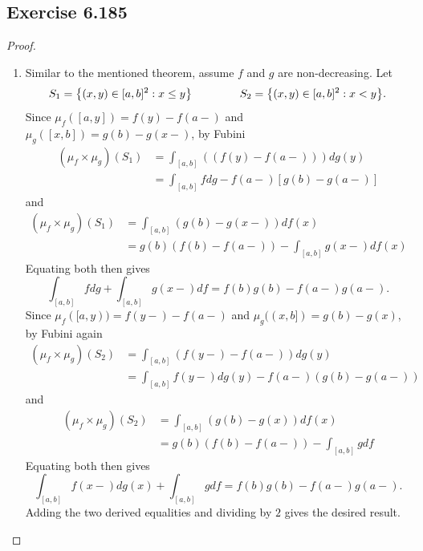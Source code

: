 \documentclass[hw_all.tex]{subfiles}
\begin{document}
\subsection{Exercise 6.185}
\begin{proof}
    \begin{enumerate}
        \item
            Similar to the mentioned theorem, assume $f$ and $g$ are non-decreasing. Let
            \[
                S_1 = \qty{(x,y) \in [a,b]^2 : x \leq y} \hspace{1.5cm} S_2 = \qty{(x,y) \in [a,b]^2 : x < y}
            .\]
            Since $\mu_f([a,y]) = f(y) - f(a-)$ and $\mu_g([x,b]) = g(b) - g(x-)$, by Fubini
            \begin{align*}
                (\mu_f \times \mu_g)(S_1) &= \int_{[a,b]} ((f(y) - f(a-))) dg(y) \\
                                          &= \int_{[a,b]} f dg - f(a-) [g(b) - g(a-)]
            \end{align*}
            and
            \begin{align*}
                (\mu_f \times \mu_g)(S_1) &= \int_{[a,b]} (g(b) - g(x-)) df(x) \\
                                          &= g(b)(f(b) - f(a-)) - \int_{[a,b]} g(x-) df(x)
            \end{align*}
            Equating both then gives
            \[
                \int_{[a,b]} f dg + \int_{[a,b]} g(x-) df = f(b) g(b) - f(a-) g(a-)
            .\]
            Since $\mu_f([a,y)) = f(y-) - f(a-)$ and $\mu_g((x,b]) = g(b) - g(x)$, by Fubini again
            \begin{align*}
                (\mu_f \times \mu_g)(S_2) &= \int_{[a,b]} (f(y-) - f(a-)) dg(y) \\
                                          &= \int_{[a,b]} f(y-) dg(y) - f(a-)(g(b) - g(a-))
            \end{align*}
            and
            \begin{align*}
                (\mu_f \times \mu_g)(S_2) &= \int_{[a,b]} (g(b) - g(x)) df(x) \\
                                          &= g(b)(f(b) - f(a-)) - \int_{[a,b]} g df
            \end{align*}
            Equating both then gives
            \[
                \int_{[a,b]} f(x-) dg(x) + \int_{[a,b]} g df = f(b)g(b) - f(a-)g(a-)
            .\]
            Adding the two derived equalities and dividing by $2$ gives the desired result.


\end{enumerate}
\end{proof}
\end{document}
